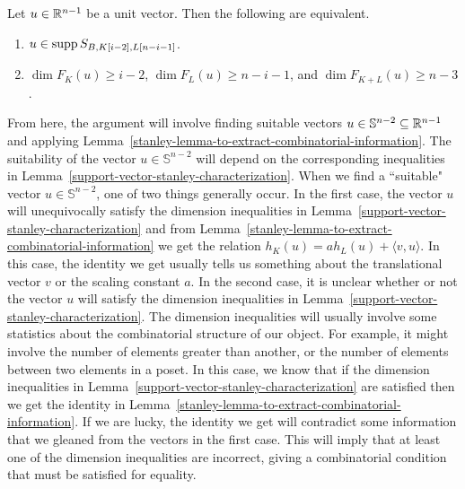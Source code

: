 \documentclass{puthesis-UG}
\begin{document}
\begin{lem} \label{support-vector-stanley-characterization}
	Let $u \in \mathbb{R}^{n-1}$ be a unit vector. Then the following are equivalent. 
	\begin{enumerate}[label = (\alph*)]
		\item $u \in \operatorname{supp} S_{B, K[i-2], L[n-i-1]}$.

		\item $\dim F_K(u) \geq i-2$, $\dim F_L(u) \geq n-i-1$, and $\dim F_{K+L}(u) \geq n-3$. 
	\end{enumerate}
\end{lem}

From here, the argument will involve finding suitable vectors $u \in \mathbb{S}^{n-2} \subseteq \mathbb{R}^{n-1}$ and applying Lemma~\ref{stanley-lemma-to-extract-combinatorial-information}. The suitability of the vector $u \in \mathbb{S}^{n-2}$ will depend on the corresponding inequalities in Lemma~\ref{support-vector-stanley-characterization}. When we find a ``suitable" vector $u \in \mathbb{S}^{n-2}$, one of two things generally occur. In the first case, the vector $u$ will unequivocally satisfy the dimension inequalities in Lemma~\ref{support-vector-stanley-characterization} and from Lemma~\ref{stanley-lemma-to-extract-combinatorial-information} we get the relation $h_K(u) = a h_L(u) + \langle v, u \rangle$. In this case, the identity we get usually tells us something about the translational vector $v$ or the scaling constant $a$. In the second case, it is unclear whether or not the vector $u$ will satisfy the dimension inequalities in Lemma~\ref{support-vector-stanley-characterization}. The dimension inequalities will usually involve some statistics about the combinatorial structure of our object. For example, it might involve the number of elements greater than another, or the number of elements between two elements in a poset. In this case, we know that if the dimension inequalities in Lemma~\ref{support-vector-stanley-characterization} are satisfied then we get the identity in Lemma~\ref{stanley-lemma-to-extract-combinatorial-information}. If we are lucky, the identity we get will contradict some information that we gleaned from the vectors in the first case. This will imply that at least one of the dimension inequalities are incorrect, giving a combinatorial condition that must be satisfied for equality. \\
\end{document}
